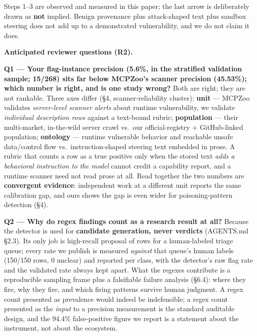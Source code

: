 \documentclass[10pt,conference]{IEEEtran}
\begin{document}
Steps 1--3 are observed and measured in this paper; the last arrow is deliberately drawn
as \textbf{not} implied. Benign provenance plus attack-shaped text plus sandbox steering
does not add up to a demonstrated vulnerability, and we do not claim it does.

\textbf{Anticipated reviewer questions (R2).}

\textbf{Q1 --- Your flag-instance precision (5.6\%, in the stratified validation sample;
15/268) sits far below MCPZoo's scanner precision (45.53\%); which number is right, and is one study wrong?} Both are right; they
are not rankable. Three axes differ (\S4, scanner-reliability cluster): \textbf{unit} ---
MCPZoo~\cite{mcpzoo} validates \emph{server-level scanner alerts} about runtime
vulnerability, we validate \emph{individual description rows} against a text-bound rubric;
\textbf{population} --- their multi-market, in-the-wild server crawl vs.\ our
official-registry + GitHub-linked population; \textbf{ontology} --- runtime vulnerable
behavior and reachable unsafe data/control flow vs.\ instruction-shaped steering text
embedded in prose. A rubric that counts a row as a true positive only when the stored text
\emph{adds a behavioral instruction to the model} cannot credit a capability report, and a
runtime scanner need not read prose at all. Read together the two numbers are
\textbf{convergent evidence}: independent work at a different unit reports the same
calibration gap, and ours shows the gap is even wider for poisoning-pattern detection
(\S4).

\textbf{Q2 --- Why do regex findings count as a research result at all?} Because the
detector is used for \textbf{candidate generation, never verdicts} (AGENTS.md \S2.3). Its
only job is high-recall proposal of rows for a human-labeled triage queue; every rate we
publish is measured \emph{against} that queue's human labels (150/150 rows, 0 unclear) and
reported per class, with the detector's raw flag rate and the validated rate always kept
apart. What the regexes contribute is a reproducible sampling frame plus a falsifiable
failure analysis (\S6.4): where they fire, why they fire, and which firing patterns survive
human judgment. A regex count presented as prevalence would indeed be indefensible; a
regex count presented as the \emph{input} to a precision measurement is the standard
auditable design, and the 94.4\% false-positive figure we report is a statement about the
instrument, not about the ecosystem.
\end{document}
